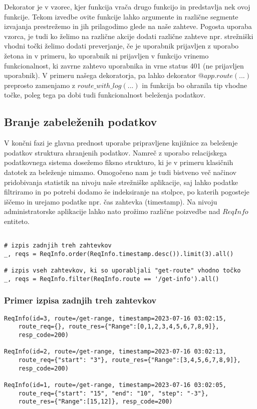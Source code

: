 \documentclass[a4paper,12pt,openright]{book}
\begin{document}
    \noindent
    Dekorator je v vzorec, kjer funkcija vrača drugo funkcijo in predstavlja nek ovoj funkcije. Tekom izvedbe ovite funkcije lahko argumente in različne segmente izvajanja prestrežemo in jih prilagodimo glede na naše zahteve. Pogosta uporaba vzorca, je tudi ko želimo na različne akcije dodati različne zahteve npr. strežniški vhodni točki želimo dodati preverjanje, če je uporabnik prijavljen z uporabo žetona in v primeru, ko uporabnik ni prijavljen v funkcijo vrinemo funkcionalnost, ki zavrne zahtevo uporabnika in vrne status 401 (ne prijavljen uporabnik). V primeru našega dekoratorja, pa lahko dekorator $@app.route(...)$ preprosto zamenjamo z $route\_with\_log(...)$ in funkcija bo ohranila tip vhodne točke, poleg tega pa dobi tudi funkcionalnost beleženja podatkov.

    \subsection{Branje zabeleženih podatkov}

    V končni fazi je glavna prednost uporabe pripravljene knjižnice za beleženje podatkov struktura shranjenih podatkov. Namreč z uporabo relacijskega podatkovnega sistema dosežemo fiksno strukturo, ki je v primeru klasičnih datotek za beleženje nimamo. Omogočeno nam je tudi bistveno več načinov pridobivanja statistik na nivoju naše strežniške aplikacije, saj lahko podatke filtriramo in po potrebi dodamo še indeksiranje na stolpce, po katerih pogosteje iščemo in urejamo podatke npr. čas zahtevka (timestamp). Na nivoju administratorske aplikacije lahko nato prožimo različne poizvedbe nad $ReqInfo$ entiteto.
\begin{verbatim}

# izpis zadnjih treh zahtevkov
_, reqs = ReqInfo.order(ReqInfo.timestamp.desc()).limit(3).all()

# izpis vseh zahtevkov, ki so uporabljali "get-route" vhodno točko
_, reqs = ReqInfo.filter(ReqInfo.route == '/get-info').all()
\end{verbatim}

    \subsubsection{Primer izpisa zadnjih treh zahtevkov}

\begin{verbatim}
ReqInfo(id=3, route=/get-range, timestamp=2023-07-16 03:02:15, 
    route_req={}, route_res={"Range":[0,1,2,3,4,5,6,7,8,9]},
    resp_code=200)
    
ReqInfo(id=2, route=/get-range, timestamp=2023-07-16 03:02:13, 
    route_req={"start": "3"}, route_res={"Range":[3,4,5,6,7,8,9]},
    resp_code=200)
    
ReqInfo(id=1, route=/get-range, timestamp=2023-07-16 03:02:05,
    route_req={"start": "15", "end": "10", "step": "-3"},
    route_res={"Range":[15,12]}, resp_code=200)
\end{verbatim}
\end{document}
